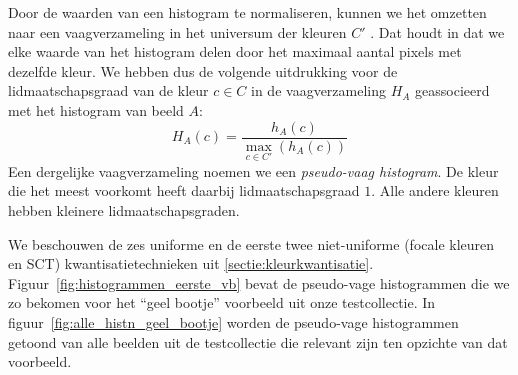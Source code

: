 Door de waarden van een histogram te normaliseren, kunnen we het omzetten naar 
een vaagverzameling in het universum der kleuren $C'$ 
\cite{debaets:similariteitsmaten_voor_kleurbeelden, vanderweken:similariteitsmaten, vertan:embedding_fuzzy_logic_in_cbir}. 
Dat houdt in dat we elke 
waarde van het histogram delen door het maximaal aantal pixels met dezelfde 
kleur. We hebben dus de volgende uitdrukking voor de lidmaatschapsgraad van de 
kleur $c \in C$ in de vaagverzameling $H_A$ geassocieerd met het histogram 
van beeld $A$: 
\begin{displaymath}
H_A(c) = \frac{\displaystyle h_A(c)}{\displaystyle \max_{c \in C'}(h_A(c))}
\end{displaymath}
Een dergelijke vaagverzameling noemen we een \emph{pseudo-vaag histogram}. 
De kleur die het meest voorkomt heeft daarbij lidmaatschapsgraad $1$. Alle 
andere kleuren hebben kleinere lidmaatschapsgraden. 

We beschouwen de zes uniforme en de eerste twee niet-uniforme (focale kleuren en SCT) 
kwantisatietechnieken uit \ref{sectie:kleurkwantisatie}. Figuur~\ref{fig:histogrammen_eerste_vb} bevat
de pseudo-vage histogrammen die we zo bekomen voor het ``geel bootje'' voorbeeld
uit onze testcollectie. In figuur~\ref{fig:alle_histn_geel_bootje} worden de pseudo-vage histogrammen
getoond van alle beelden uit de testcollectie die relevant zijn ten opzichte van dat voorbeeld.

